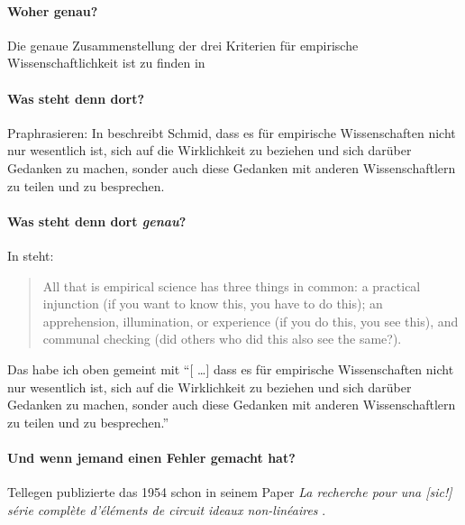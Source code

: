 \paragraph{Woher genau?}
Die genaue Zusammenstellung der drei Kriterien für empirische Wissenschaftlichkeit ist zu finden in \cite[S.~80]{Schmid2003}

\paragraph{Was steht denn dort?}
Praphrasieren: In \cite{Schmid2003} beschreibt Schmid, dass es für empirische Wissenschaften nicht nur wesentlich ist, sich auf die Wirklichkeit zu beziehen und sich darüber Gedanken zu machen, sonder auch diese Gedanken mit anderen Wissenschaftlern zu teilen und zu besprechen.

\paragraph{Was steht denn dort \emph{genau}?}
In \cite{Schmid2003} steht:
\begin{quote}
All that is empirical science has three things in
common: a practical injunction (if you want to know
this, you have to do this); an apprehension, illumination, or experience (if you do this, you see this), and communal checking (did others who did this also see the same?).
\end{quote}
Das habe ich oben gemeint mit \enquote{[ \ldots ] dass es für empirische Wissenschaften nicht nur wesentlich ist, sich auf die Wirklichkeit zu beziehen und sich darüber Gedanken zu machen, sonder auch diese Gedanken mit anderen Wissenschaftlern zu teilen und zu besprechen.}

\paragraph{Und wenn jemand einen Fehler gemacht hat?}
Tellegen publizierte das 1954 schon in seinem Paper \emph{La recherche pour una [sic!] s{\'e}rie compl{\`e}te d’{\'e}l{\'e}ments de circuit ideaux non-lin{\'e}aires} \cite{Tellegen1954}.